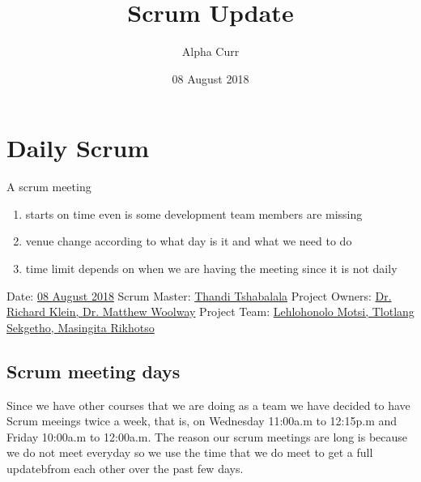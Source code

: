 \documentclass[11pt]{article}
\begin{document}
\title{Scrum Update}
\author{Alpha Curr}
\date{08 August 2018}
\maketitle

\section{Daily Scrum}
A scrum meeting
\begin{enumerate}[nosep, label=\textendash]
	\item starts on time even is some development team members are missing
	\item venue change according to what day is it and what we need to do
	\item time limit depends on when we are having the meeting since it is not daily
\end{enumerate}

\hfill

\noindent
Date: \hspace{18mm} \underline{08 August 2018\hspace{0.3cm}}
\newline
Scrum Master: \hspace{3mm} \underline{Thandi Tshabalala\hspace{0.3cm}}
\newline
Project Owners: \hspace{1mm} \underline{Dr. Richard Klein, Dr. Matthew Woolway\hspace{0.3cm}}
\newline
Project Team: \hspace{5mm} \underline{Lehlohonolo Motsi, Tlotlang Sekgetho, Masingita Rikhotso\hspace{0.3cm}}
\newline


\subsection{Scrum meeting days}
Since we have other courses that we are doing as a team we have decided to have Scrum meeings twice a week, that is, on Wednesday 11:00a.m to 12:15p.m and Friday 10:00a.m to 12:00a.m. The reason our scrum meetings are long is because we do not meet everyday so we use the time that we do meet to get a full updatebfrom each other over the past few days.
\newline
\end{document}
